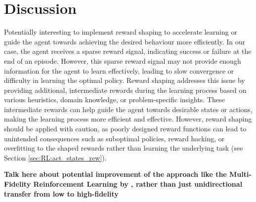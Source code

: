 \section{Discussion}
\label{sec:RL:discussion}

Potentially interesting to implement reward shaping to accelerate learning or guide the agent towards achieving the desired behaviour more efficiently. In our case, the agent receives a sparse reward signal, indicating success or failure at the end of an episode. However, this sparse reward signal may not provide enough information for the agent to learn effectively, leading to slow convergence or difficulty in learning the optimal policy. Reward shaping addresses this issue by providing additional, intermediate rewards during the learning process based on various heuristics, domain knowledge, or problem-specific insights. These intermediate rewards can help guide the agent towards desirable states or actions, making the learning process more efficient and effective. However, reward shaping should be applied with caution, as poorly designed reward functions can lead to unintended consequences such as suboptimal policies, reward hacking, or overfitting to the shaped rewards rather than learning the underlying task (see Section \ref{sec:RL:act_states_rew}).

\textbf{Talk here about potential improvement of the approach like the Multi-Fidelity Reinforcement Learning by \citet{cutler2014reinforcement}, rather than just unidirectional transfer from low to high-fidelity}